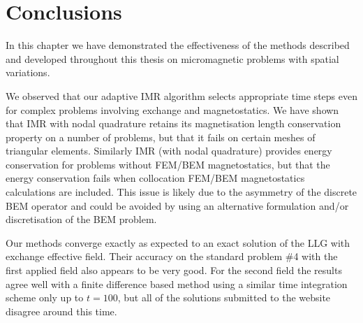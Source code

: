 \section{Conclusions}

In this chapter we have demonstrated the effectiveness of the methods described and developed throughout this thesis on micromagnetic problems with spatial variations.

We observed that our adaptive IMR algorithm selects appropriate time steps even for complex problems involving exchange and magnetostatics.
We have shown that IMR with nodal quadrature retains its magnetisation length conservation property on a number of problems, but that it fails on certain meshes of triangular elements.
Similarly IMR (with nodal quadrature) provides energy conservation for problems without FEM/BEM magnetostatics, but that the energy conservation fails when collocation FEM/BEM magnetostatics calculations are included.
This issue is likely due to the asymmetry of the discrete BEM operator and could be avoided by using an alternative formulation and/or discretisation of the BEM problem.

Our methods converge exactly as expected to an exact solution of the LLG with exchange effective field.
Their accuracy on the \mumag standard problem \#4 with the first applied field also appears to be very good.
For the second field the results agree well with a finite difference based method using a similar time integration scheme only up to $t=100$, but all of the solutions submitted to the \mumag website disagree around this time.


